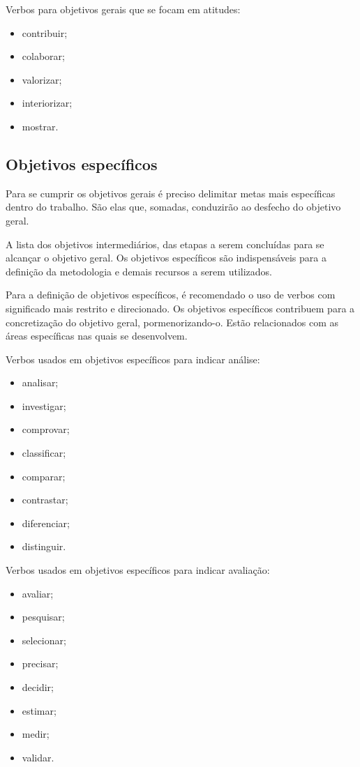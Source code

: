 Verbos para objetivos gerais que se focam em atitudes:
\begin{itemize}
\item contribuir;
\item colaborar;
\item valorizar;
\item interiorizar;
\item mostrar.
\end{itemize}

\subsection{Objetivos específicos}
\label{sec:intro:obj:esp}

Para se cumprir os objetivos gerais é preciso delimitar metas mais específicas
dentro do trabalho. São elas que, somadas, conduzirão ao desfecho do objetivo
geral.

A lista dos objetivos intermediários, das etapas a serem concluídas para se
alcançar o objetivo geral. Os objetivos específicos são indispensáveis para a
definição da metodologia e demais recursos a serem utilizados.

Para a definição de objetivos específicos, é recomendado o uso de verbos
com significado mais restrito e direcionado. Os objetivos específicos
contribuem para a concretização do objetivo geral, pormenorizando-o. Estão
relacionados com as áreas específicas nas quais se desenvolvem.

Verbos usados em objetivos específicos para indicar análise:
\begin{itemize}
\item analisar;
\item investigar;
\item comprovar;
\item classificar;
\item comparar;
\item contrastar;
\item diferenciar;
\item distinguir.
\end{itemize}

Verbos usados em objetivos específicos para indicar avaliação:
\begin{itemize}
\item avaliar;
\item pesquisar;
\item selecionar;
\item precisar;
\item decidir;
\item estimar;
\item medir;
\item validar.
\end{itemize}


